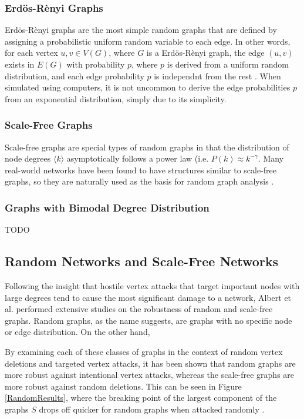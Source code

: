 \documentclass[11pt]{article}
\begin{document}
\subsubsection{Erd\"{o}s-R\`{e}nyi Graphs}
Erd\"{o}s-R\`{e}nyi graphs are the most simple random graphs that are defined by assigning a probabilistic uniform random variable to each edge. In other words, for each vertex $u, v \in V(G)$, where $G$ is a Erd\"{o}s-R\`{e}nyi graph, the edge $(u,v)$ exists in $E(G)$ with probability $p$, where $p$ is derived from a uniform random distribution, and each edge probability $p$ is independnt from the rest \cite{LargeNetworkRobustness-PVM}. When simulated using computers, it is not uncommon to derive the edge probabilities $p$ from an exponential distribution, simply due to its simplicity.

\subsubsection{Scale-Free Graphs}
Scale-free graphs are special types of random graphs in that the distribution of node degrees $\langle k \rangle$ asymptotically follows a power law (i.e. $P(k) \approx k^{-\gamma}$. Many real-world networks have been found to have structures similar to scale-free graphs, so they are naturally used as the basis for random graph analysis \cite{AttacksWavesRandom}. 

\subsubsection{Graphs with Bimodal Degree Distribution}
TODO

\subsection{Random Networks and Scale-Free Networks}


Following the insight that hostile vertex attacks that target important nodes with large degrees tend to cause the most significant damage to a network, Albert et al. performed extensive studies on the robustness of random and scale-free graphs. Random graphs, as the name suggests, are graphs with no specific node or edge distribution. On the other hand, 


By examining each of these classes of graphs in the context of random vertex deletions and targeted vertex attacks, it has been shown that random graphs are more robust against intentional vertex attacks, whereas the scale-free graphs are more robust against random deletions. This can be seen in Figure \ref{RandomResults}, where the breaking point of the largest component of the graphs $S$ drops off quicker for random graphs when attacked randomly \cite{GraphThesis}. 
\end{document}

